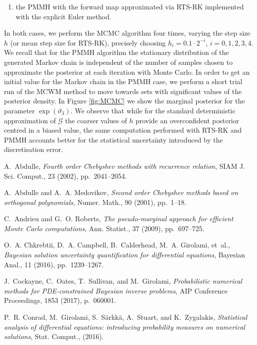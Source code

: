 \documentclass{siamart1116}
\numberwithin{theorem}{section}
\renewcommand{\theta}{\vartheta}
\begin{document}
{\begin{enumerate}
	 \item the PMMH with the forward map approximated via RTS-RK implemented with the explicit Euler method.
\end{enumerate}
In both cases, we perform the MCMC algorithm four times, varying the step size $h$ (or mean step size for RTS-RK), precisely choosing $h_i = 0.1\cdot2^{-i}$, $i = 0, 1, 2, 3, 4$. We recall that for the PMMH algorithm the stationary distribution of the generated Markov chain is independent of the number of samples chosen to approximate the posterior at each iteration with Monte Carlo. In order to get an initial value for the Markov chain in the PMMH case, we perform a short trial run of the MCWM method to move towards sets with significant values of the posterior density. In Figure \ref{fig:MCMC} we show the marginal posterior for the parameter $\exp(\theta_3)$. We observe that while for the standard deterministic approximation of $\mathcal{G}$ the coarser values of $h$ provide an overconfident posterior centred in a biased value, the same computation performed with RTS-RK and PMMH accounts better for the statistical uncertainty introduced by the discretisation error.

\def\cprime{$'$}
\begin{thebibliography}{10}
	
	{\sc A.~Abdulle}, {\em Fourth order {C}hebyshev methods with recurrence
		relation}, SIAM J. Sci. Comput., 23 (2002), pp.~2041--2054.
	
	{\sc A.~Abdulle and A.~A. Medovikov}, {\em Second order {C}hebyshev methods
		based on orthogonal polynomials}, Numer. Math., 90 (2001), pp.~1--18.
	
	{\sc C.~Andrieu and G.~O. Roberts}, {\em The pseudo-marginal approach for
		efficient {M}onte {C}arlo computations}, Ann. Statist., 37 (2009),
	pp.~697--725.
	
	{\sc O.~A. Chkrebtii, D.~A. Campbell, B.~Calderhead, M.~A. Girolami, et~al.},
	{\em Bayesian solution uncertainty quantification for differential
		equations}, Bayesian Anal., 11 (2016), pp.~1239--1267.
	
	{\sc J.~Cockayne, C.~Oates, T.~Sullivan, and M.~Girolami}, {\em Probabilistic
		numerical methods for {PDE}-constrained {B}ayesian inverse problems}, AIP
	Conference Proceedings, 1853 (2017), p.~060001.
	
	{\sc P.~R. Conrad, M.~Girolami, S.~S{\"a}rkk{\"a}, A.~Stuart, and
		K.~Zygalakis}, {\em Statistical analysis of differential equations:
		introducing probability measures on numerical solutions}, Stat. Comput.,
	(2016).
	

\end{thebibliography}}
\end{document}
